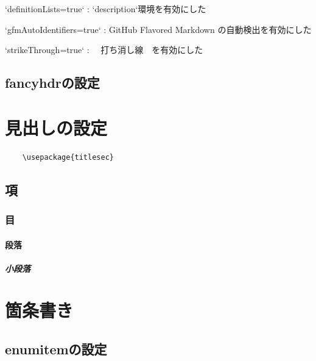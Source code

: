 \documentclass[
    article,
    head_space=25truemm,
    foot_space=10truemm,
    gutter=15truemm]{jlreq}
\begin{document}
\begin{markdown}
`definitionLists=true`
: `description`環境を有効にした

`gfmAutoIdentifiers=true`
: GitHub Flavored Markdown の自動検出を有効にした

`strikeThrough=true`
: ~~打ち消し線~~を有効にした
\end{markdown}

\subsection{fancyhdrの設定}


\section{見出しの設定}

\begin{verbatim}
    \usepackage{titlesec}
\end{verbatim}


\subsection{項}


\subsubsection{目}


\paragraph{段落}


\subparagraph{小段落}



\section{箇条書き}

\subsection{enumitemの設定}

\inputminted{latex}{./preamble/enumitem.tex}
\end{document}
